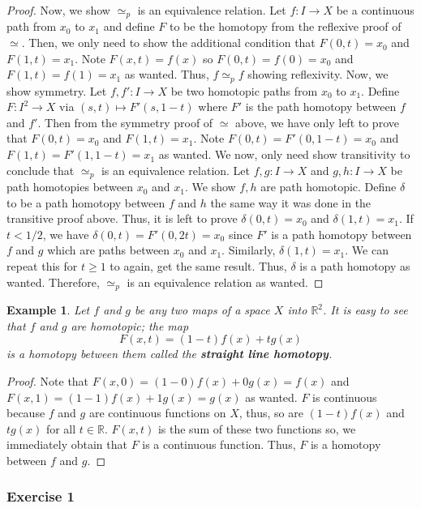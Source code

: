 \documentclass{article}
\newtheorem{example}[theorem]{Example}
\begin{document}
\begin{proof}
	Now, we show $\simeq_p$ is an equivalence relation. Let $f: I\to X$ be a continuous path from $x_0$ to $x_1$ and define $F$ to be the homotopy from the reflexive 
	proof of $\simeq$. Then, we only need to show the additional condition that $F(0,t) = x_0$ and $F(1,t) = x_1$. Note $F(x,t) = f(x)$ so $F(0,t) = f(0) = x_0$ and $F(1,t)=f(1)=x_1$
	as wanted. Thus, $f\simeq_p f$ showing reflexivity. Now, we show symmetry. Let $f,f':I\to X$ be two homotopic paths from $x_0$ to $x_1$. Define $F:I^2 \to X$ via
	$(s,t)\mapsto F'(s,1-t)$ where $F'$ is the path homotopy between $f$ and $f'$. Then from the symmetry proof of $\simeq$ above, we have only left to prove that
	$F(0,t) = x_0$ and $F(1,t) = x_1$. Note $F(0,t) = F'(0,1-t) = x_0$ and $F(1,t) = F'(1,1-t) = x_1$ as wanted. We now, only need show transitivity to conclude that $\simeq_p$ is
	an equivalence relation. Let $f,g:I\to X$ and $g,h:I\to X$ be path homotopies between $x_0$ and $x_1$. We show $f,h$ are path homotopic. Define $\delta$ to be a path
	homotopy between $f$ and $h$ the same way it was done in the transitive proof above. Thus, it is left to prove $\delta(0,t) = x_0$ and $\delta(1,t) = x_1$.
	If $t<1/2$, we have $\delta(0,t) = F'(0,2t) = x_0$ since $F'$ is a path homotopy between $f$ and $g$ which are paths between $x_0$ and $x_1$. Similarly, $\delta(1,t) = x_1$.
	We can repeat this for $t\geq 1$ to again, get the same result. Thus, $\delta$ is a path homotopy as wanted. Therefore, $\simeq_p$ is an equivalence relation as wanted.
\end{proof}

\begin{example}
	Let $f$ and $g$ be any two maps of a space $X$ into $\mathbb{R}^2$. It is easy to see that $f$ and $g$ are homotopic; the map
	\[ F(x,t) = (1-t)f(x) + tg(x) \]
	is a homotopy between them called the \textbf{straight line homotopy}.
\end{example}
\begin{proof}
	Note that $F(x,0) = (1-0)f(x) + 0g(x) = f(x)$ and $F(x,1) = (1-1)f(x) + 1g(x) = g(x)$ as wanted. $F$ is continuous because $f$ and $g$ are continuous functions on $X$, thus,
	so are $(1-t)f(x)$ and $tg(x)$ for all $t\in\mathbb{R}$. $F(x,t)$ is the sum of these two functions so, we immediately obtain that $F$ is a continuous function. Thus, $F$ is a homotopy
	between $f$ and $g$. 
\end{proof}

\subsubsection*{Exercise 1}
\end{document}

